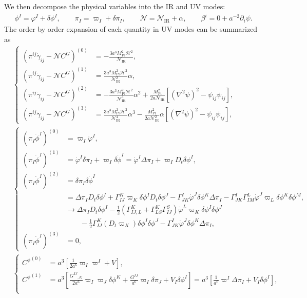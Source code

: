 \documentclass[aps, prd
, preprint
, nofootinbib 
, longbibliography
]{revtex4-1}
\newcommand{\Mpl}{M_\mathrm{Pl}}
\newcommand{\IR}{\mathrm{IR}}
\newcommand{\dps}{\displaystyle}
\newcommand{\calH}{\mathcal{H}}
\newcommand{\calN}{\mathcal{N}}
\newcommand{\dphi}{\delta\phi}
\newcommand{\dpi}{\delta\pi}
\newcommand{\Dpi}{\Delta\pi}
\newcommand{\bae}[1]{\begin{align} #1 \end{align}}
\newcommand{\bce}[1]{\begin{cases} #1 \end{cases}}
\begin{document}
We then decompose the physical variables into the IR and UV modes:
\bae{\label{eq: direct decomposition}
    \phi^I=\varphi^I+\dphi^I, \qquad \pi_I=\varpi_I+\dpi_I, \qquad \calN=\calN_\IR+\alpha, \qquad \beta^i=0+a^{-2}\partial_i\psi.
}
The order by order expansion of each quantity in UV modes can be summarized as
\bae{
	&\bce{
    		\dps
 	   	(\pi^{ij}\dot{\gamma}_{ij}-\calN C^G)^{(0)} &
		\dps
		=-\frac{3a^3\Mpl^2\calH^2}{\calN_\IR}, \\
		\dps
		(\pi^{ij}\dot{\gamma}_{ij}-\calN C^G)^{(1)} &
		\dps
		=\frac{3a^3\Mpl^2\calH^2}{\calN_\IR^2}\alpha, \\
		\dps
		(\pi^{ij}\dot{\gamma}_{ij}-\calN C^G)^{(2)} & 
		\dps
		=-\frac{3a^3\Mpl^2\calH^2}{\calN_\IR^3}\alpha^2+\frac{\Mpl^2}{2a\calN_\IR}[(\nabla^2\psi)^2-\psi_{ij}\psi_{ij}], \\
		\dps
		(\pi^{ij}\dot{\gamma}_{ij}-\calN C^G)^{(3)} & 
		\dps
		=\frac{3a^3\Mpl^2\calH^2}{\calN_\IR^4}\alpha^3-\frac{\Mpl^2}{2a\calN_\IR^2}\alpha[(\nabla^2\psi)^2-\psi_{ij}\psi_{ij}],
	    } \\
    &\bce{
        \dps
        (\pi_I\dot{\phi}^I)^{(0)} & 
        \dps
        =\varpi_I\dot{\varphi}^I, \\
        \dps
        (\pi_I\dot{\phi}^I)^{(1)} &
        \dps
        =\dot{\varphi}^I\dpi_I+\varpi_I\delta\dot{\phi}^I=\dot{\varphi}^I\Dpi_I+\varpi_ID_t\dphi^I, \\
        \dps
        (\pi_I\dot{\phi}^I)^{(2)} &
        \dps
        =\dpi_I\delta\dot{\phi}^I \\
        &\dps
        =\Dpi_ID_t\dphi^I+\Gamma^K_{IJ}\varpi_K\dphi^ID_t\dphi^J-\Gamma^I_{JK}\dot{\varphi}^J\dphi^K\Dpi_I-\Gamma^I_{JK}\Gamma^L_{IM}\dot{\varphi}^J\varpi_L\dphi^K\dphi^M, \\
        &\dps
        \to\Dpi_ID_t\dphi^I-\frac{1}{2}(\Gamma^K_{IJ,L}+\Gamma^K_{LS}\Gamma^S_{IJ})\dot{\varphi}^L\varpi_K\dphi^I\dphi^J \\
        &\dps \qquad
        -\frac{1}{2}\Gamma^K_{IJ}(D_t\varpi_K)\dphi^I\dphi^J-\Gamma^I_{JK}\dot{\varphi}^J\dphi^K\Dpi_I, \\
        \dps
        (\pi_I\dot{\phi}^I)^{(3)} &
        \dps
        =0,
    } \\
    &\bce{
        \dps
        {C^\phi}^{(0)} &
        \dps
        =a^3\left[\frac{1}{2a^6}\varpi_I\varpi^I+V\right], \\
        \dps
        {C^\phi}^{(1)} &
        \dps
        =a^3\left[\frac{G^{IJ}{}_{,K}}{2a^6}\varpi_I\varpi_J\dphi^K+\frac{G^{IJ}}{a^6}\varpi_I\dpi_J+V_I\dphi^I\right]=a^3\left[\frac{1}{a^6}\varpi^I\Dpi_I+V_I\dphi^I\right], \\
}}
\end{document}
